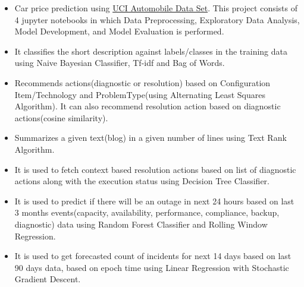 

\begin{itemize}
\item Car price prediction using \href{https://archive.ics.uci.edu/ml/datasets/Automobile}{UCI Automobile Data Set}. This project consists of 4 jupyter notebooks in which Data Preprocessing, Exploratory Data Analysis, Model Development, and Model Evaluation is performed.
\end{itemize}
\smallskip
{}
\begin{itemize}
\item It classifies the short description against labels/classes in the training data using Naive Bayesian Classifier, Tf-idf and Bag of Words.
\end{itemize}
\smallskip
{}
\begin{itemize}
\item Recommends actions(diagnostic or resolution) based on Configuration Item/Technology and ProblemType(using Alternating Least Squares Algorithm). It can also recommend resolution action based on diagnostic actions(cosine similarity).
\end{itemize}
\smallskip
{}
\begin{itemize}
\item Summarizes a given text(blog) in a given number of lines using Text Rank Algorithm.
\end{itemize}
\smallskip
{}
\begin{itemize}
\item 
It is used to fetch context based resolution actions based on list of diagnostic actions along with the execution status using Decision Tree Classifier.
\end{itemize}
\smallskip
{}
\begin{itemize}
\item 
It is used to predict if there will be an outage in next 24 hours based on last 3 months events(capacity, availability, performance, compliance, backup, diagnostic) data using Random Forest Classifier and Rolling Window Regression.
\end{itemize}
\smallskip
{}
\begin{itemize}
\item It is used to get forecasted count of incidents for next 14 days based on last 90 days data, based on epoch time using Linear Regression with Stochastic Gradient Descent.
\end{itemize}
\cvproject{}